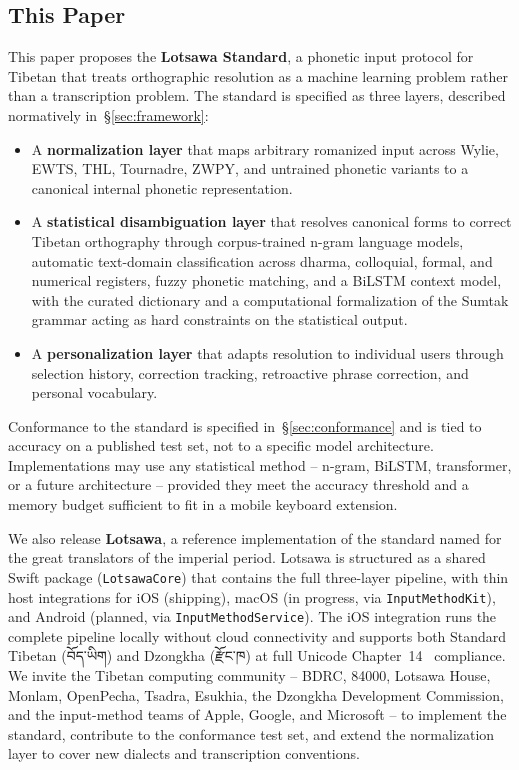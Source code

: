 \documentclass[11pt]{article}
\newcommand{\tib}[1]{{\fontspec{Jomolhari}#1}}
\begin{document}
\subsection{This Paper}

This paper proposes the \textbf{Lotsawa Standard}, a phonetic input protocol for Tibetan that treats orthographic resolution as a machine learning problem rather than a transcription problem. The standard is specified as three layers, described normatively in~\S\ref{sec:framework}:

\begin{itemize}
\item A \textbf{normalization layer} that maps arbitrary romanized input across Wylie, EWTS, THL, Tournadre, ZWPY, and untrained phonetic variants to a canonical internal phonetic representation.
\item A \textbf{statistical disambiguation layer} that resolves canonical forms to correct Tibetan orthography through corpus-trained n-gram language models, automatic text-domain classification across dharma, colloquial, formal, and numerical registers, fuzzy phonetic matching, and a BiLSTM context model, with the curated dictionary and a computational formalization of the Sumtak grammar acting as hard constraints on the statistical output.
\item A \textbf{personalization layer} that adapts resolution to individual users through selection history, correction tracking, retroactive phrase correction, and personal vocabulary.
\end{itemize}

Conformance to the standard is specified in~\S\ref{sec:conformance} and is tied to accuracy on a published test set, not to a specific model architecture. Implementations may use any statistical method -- n-gram, BiLSTM, transformer, or a future architecture -- provided they meet the accuracy threshold and a memory budget sufficient to fit in a mobile keyboard extension.

We also release \textbf{Lotsawa}, a reference implementation of the standard named for the great translators of the imperial period. Lotsawa is structured as a shared Swift package (\texttt{LotsawaCore}) that contains the full three-layer pipeline, with thin host integrations for iOS (shipping), macOS (in progress, via \texttt{InputMethodKit}), and Android (planned, via \texttt{InputMethodService}). The iOS integration runs the complete pipeline locally without cloud connectivity and supports both Standard Tibetan (\tib{བོད་ཡིག}) and Dzongkha (\tib{རྫོང་ཁ}) at full Unicode Chapter~14~\cite{unicode14} compliance. We invite the Tibetan computing community -- BDRC, 84000, Lotsawa House, Monlam, OpenPecha, Tsadra, Esukhia, the Dzongkha Development Commission, and the input-method teams of Apple, Google, and Microsoft -- to implement the standard, contribute to the conformance test set, and extend the normalization layer to cover new dialects and transcription conventions.
\end{document}
